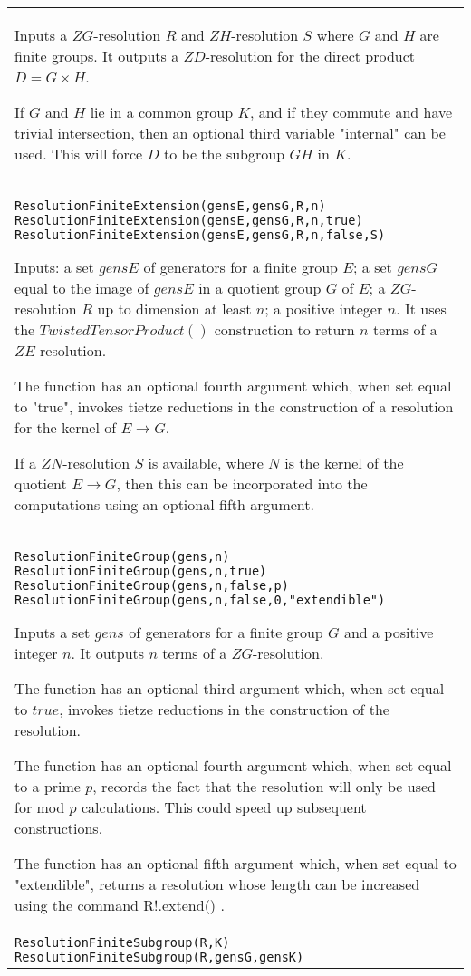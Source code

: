 \documentclass[a4paper,11pt]{report}
\begin{document}
{\begin{center}
\begin{tabular}{|l|}
 Inputs a $ZG$-resolution $R$ and $ZH$-resolution $S$ where $G$ and $H$ are finite groups. It outputs a $ZD$-resolution for the direct product $D=G{\ensuremath{\times}}H$.

 If $G$ and $H$ lie in a common group $K$, and if they commute and have trivial intersection, then an optional third
variable "internal" can be used. This will force $D$ to be the subgroup $GH$ in $K$. \\
 \index{ResolutionFiniteExtension} \texttt{ResolutionFiniteExtension(gensE,gensG,R,n)} \texttt{ResolutionFiniteExtension(gensE,gensG,R,n,true) } \texttt{ResolutionFiniteExtension(gensE,gensG,R,n,false,S) } 

 Inputs: a set $gensE$ of generators for a finite group $E$; a set $gensG$ equal to the image of $gensE$ in a quotient group $G$ of $E$; a $ZG$-resolution $R$ up to dimension at least $n$; a positive integer $n$. It uses the $TwistedTensorProduct()$ construction to return $n$ terms of a $ZE$-resolution.

 The function has an optional fourth argument which, when set equal to "true",
invokes tietze reductions in the construction of a resolution for the kernel
of $E \longrightarrow G$.

 If a $ZN$-resolution $S$ is available, where $N$ is the kernel of the quotient $E \longrightarrow G$, then this can be incorporated into the computations using an optional fifth
argument. \\
 \index{ResolutionFiniteGroup} \texttt{ResolutionFiniteGroup(gens,n)} \texttt{ResolutionFiniteGroup(gens,n,true)} \texttt{ResolutionFiniteGroup(gens,n,false,p) } \texttt{ResolutionFiniteGroup(gens,n,false,0,"extendible") } 

 Inputs a set $gens$ of generators for a finite group $G$ and a positive integer $n$. It outputs $n$ terms of a $ZG$-resolution.

 The function has an optional third argument which, when set equal to $true$, invokes tietze reductions in the construction of the resolution. 

 The function has an optional fourth argument which, when set equal to a prime $p$, records the fact that the resolution will only be used for mod $p$ calculations. This could speed up subsequent constructions. 

 The function has an optional fifth argument which, when set equal to
"extendible", returns a resolution whose length can be increased using the
command R!.extend() . \\
 \index{ResolutionFiniteSubgroup} \texttt{ResolutionFiniteSubgroup(R,K)} \texttt{ResolutionFiniteSubgroup(R,gensG,gensK)} 


\end{tabular}
\end{center}}
\end{document}
